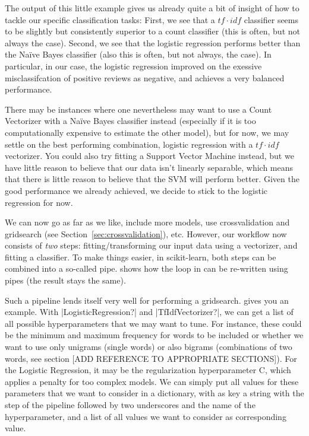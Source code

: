 
The output of this little example gives us already quite a bit of
insight of how to tackle our specific classification tasks: First, we
see that a $tf\cdot idf$ classifier seems to be slightly but
consistently superior to a count classifier (this is often, but not
always the case). Second, we see that the logistic regression performs
better than the Na\"ive Bayes classifier (also this is often, but not
always, the case). In particular, in our case, the logistic regression
improved on the exessive misclassifcation of positive reviews as
negative, and achieves a very balanced performance.

There may be instances where one nevertheless may want to use a Count
Vectorizer with a Na\"ive Bayes classifier instead (especially if it
is too computationally expensive to estimate the other model), but for
now, we may settle on the best performing combination, logistic
regression with a $tf\cdot idf$ vectorizer. You could also try fitting
a Support Vector Machine instead, but we have little reason to believe
that our data isn't linearly separable, which means that there is
little reason to believe that the SVM will perform better. Given the
good performance we already achieved, we decide to stick to the
logistic regression for now.


We can now go as far as we like, include more models, use
crossvalidation and gridsearch (see
Section~\ref{sec:crossvalidation}), etc. However, our workflow now
consists of \emph{two} steps: fitting/transforming our input data
using a vectorizer, and fitting a classifier. To make things easier,
in scikit-learn, both steps can be combined into a so-called
pipe.  shows how the loop in
 can be re-written using pipes (the
result stays the same).


Such a pipeline lends itself very well for performing a
gridsearch.  gives you an example.  With
|LogisticRegression?| and |TfIdfVectorizer?|, we can get a list of all
possible hyperparameters that we may want to tune. For instance, these
could be the minimum and maximum frequency for words to be included or
whether we want to use only unigrams (single words) or also bigrams
(combinations of two words, see section [ADD REFERENCE TO APPROPRIATE
  SECTIONS]). For the Logistic Regression, it may be the
regularization hyperparameter C, which applies a penalty for too
complex models.  We can simply put all values for these parameters
that we want to consider in a dictionary, with as key a string with
the step of the pipeline followed by two underscores and the name of
the hyperparameter, and a list of all values we want to consider as
corresponding value.

